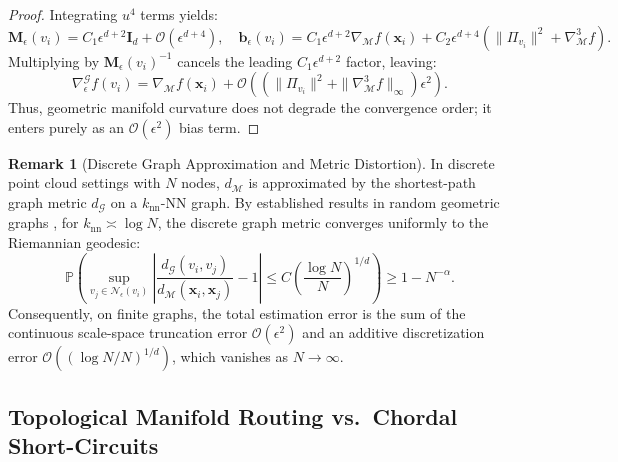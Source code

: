 \documentclass[11pt,a4paper]{article}
\theoremstyle{definition}
\newtheorem{remark}{Remark}
\begin{document}
\begin{proof}
Integrating $u^4$ terms yields:
\begin{equation}
\mathbf{M}_\epsilon(v_i) = C_1 \epsilon^{d+2} \mathbf{I}_d + \mathcal{O}(\epsilon^{d+4}), \quad \mathbf{b}_\epsilon(v_i) = C_1 \epsilon^{d+2} \nabla_{\mathcal{M}} f(\mathbf{x}_i) + C_2 \epsilon^{d+4} \left( \|\Pi_{v_i}\|^2 + \nabla_{\mathcal{M}}^3 f \right).
\end{equation}
Multiplying by $\mathbf{M}_\epsilon(v_i)^{-1}$ cancels the leading $C_1 \epsilon^{d+2}$ factor, leaving:
\begin{equation}
\nabla_\epsilon^{\mathcal{G}} f(v_i) = \nabla_{\mathcal{M}} f(\mathbf{x}_i) + \mathcal{O}\left( \left( \|\Pi_{v_i}\|^2 + \|\nabla_{\mathcal{M}}^3 f\|_\infty \right) \epsilon^2 \right).
\end{equation}
Thus, geometric manifold curvature does not degrade the convergence order; it enters purely as an $\mathcal{O}(\epsilon^2)$ bias term.
\end{proof}

\begin{remark}[Discrete Graph Approximation and Metric Distortion]
In discrete point cloud settings with $N$ nodes, $d_{\mathcal{M}}$ is approximated by the shortest-path graph metric $d_{\mathcal{G}}$ on a $k_{\text{nn}}$-NN graph. By established results in random geometric graphs \cite{tenenbaum2000, alamgir2012}, for $k_{\text{nn}} \asymp \log N$, the discrete graph metric converges uniformly to the Riemannian geodesic:
\begin{equation}
\mathbb{P}\left( \sup_{v_j \in \mathcal{N}_\epsilon(v_i)} \left| \frac{d_{\mathcal{G}}(v_i, v_j)}{d_{\mathcal{M}}(\mathbf{x}_i, \mathbf{x}_j)} - 1 \right| \le C \left( \frac{\log N}{N} \right)^{1/d} \right) \ge 1 - N^{-\alpha}.
\end{equation}
Consequently, on finite graphs, the total estimation error is the sum of the continuous scale-space truncation error $\mathcal{O}(\epsilon^2)$ and an additive discretization error $\mathcal{O}\left( (\log N / N)^{1/d} \right)$, which vanishes as $N \to \infty$.
\end{remark}

\subsection{Topological Manifold Routing vs.\ Chordal Short-Circuits}
\end{document}
